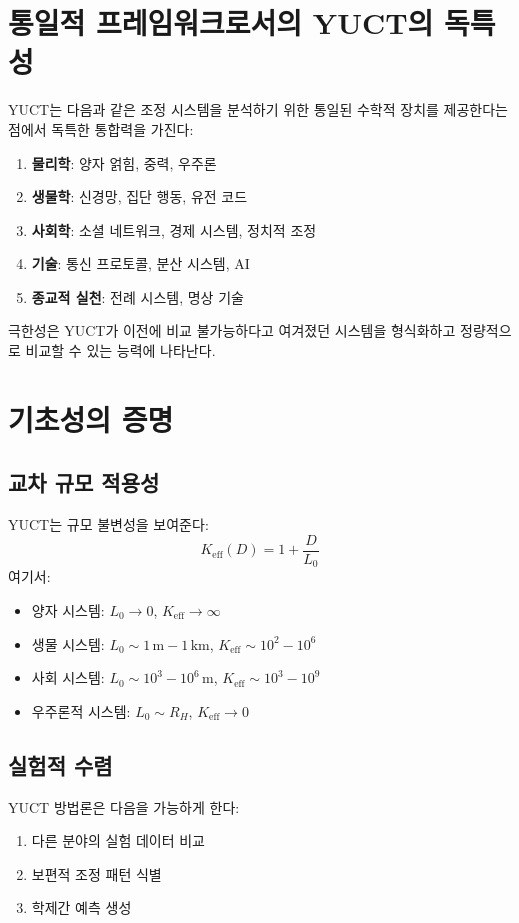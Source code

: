 \documentclass[12pt,a4paper]{article}
\begin{document}
	\section{통일적 프레임워크로서의 YUCT의 독특성}
	
	YUCT는 다음과 같은 조정 시스템을 분석하기 위한 통일된 수학적 장치를 제공한다는 점에서 독특한 통합력을 가진다:
	\begin{enumerate}
		\item \textbf{물리학}: 양자 얽힘, 중력, 우주론
		\item \textbf{생물학}: 신경망, 집단 행동, 유전 코드
		\item \textbf{사회학}: 소셜 네트워크, 경제 시스템, 정치적 조정
		\item \textbf{기술}: 통신 프로토콜, 분산 시스템, AI
		\item \textbf{종교적 실천}: 전례 시스템, 명상 기술
	\end{enumerate}
	
	극한성은 YUCT가 이전에 비교 불가능하다고 여겨졌던 시스템을 형식화하고 정량적으로 비교할 수 있는 능력에 나타난다.
	
	\section{기초성의 증명}
	
	\subsection{교차 규모 적용성}
	
	YUCT는 규모 불변성을 보여준다:
	\[
	K_{\mathrm{eff}}(D) = 1 + \frac{D}{L_0}
	\]
	여기서:
	\begin{itemize}
		\item 양자 시스템: $L_0 \to 0$, $K_{\mathrm{eff}} \to \infty$
		\item 생물 시스템: $L_0 \sim 1\,\mathrm{m}-1\,\mathrm{km}$, $K_{\mathrm{eff}} \sim 10^2-10^6$
		\item 사회 시스템: $L_0 \sim 10^3-10^6\,\mathrm{m}$, $K_{\mathrm{eff}} \sim 10^3-10^9$
		\item 우주론적 시스템: $L_0 \sim R_H$, $K_{\mathrm{eff}} \to 0$
	\end{itemize}
	
	\subsection{실험적 수렴}
	
	YUCT 방법론은 다음을 가능하게 한다:
	\begin{enumerate}
		\item 다른 분야의 실험 데이터 비교
		\item 보편적 조정 패턴 식별
		\item 학제간 예측 생성
	\end{enumerate}
	
\end{document}
